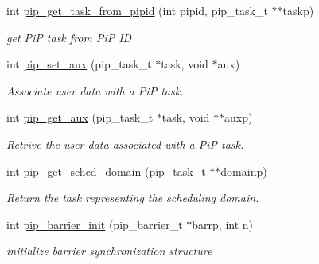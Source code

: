 \begin{DoxyCompactItemize}
\item 
int \hyperlink{group__libpip_ga6772c4ea654ccd1e0ca637f729cf3e88}{pip\-\_\-get\-\_\-task\-\_\-from\-\_\-pipid} (int pipid, pip\-\_\-task\-\_\-t $\ast$$\ast$taskp)
\begin{DoxyCompactList}\small\item\em get Pi\-P task from Pi\-P I\-D \end{DoxyCompactList}\end{DoxyCompactItemize}
\begin{DoxyCompactItemize}
\item 
int \hyperlink{group__libpip_gacfd984207deedf86edddbb72c5d4e883}{pip\-\_\-set\-\_\-aux} (pip\-\_\-task\-\_\-t $\ast$task, void $\ast$aux)
\begin{DoxyCompactList}\small\item\em Associate user data with a Pi\-P task. \end{DoxyCompactList}\end{DoxyCompactItemize}
\begin{DoxyCompactItemize}
\item 
int \hyperlink{group__libpip_ga8bf51911ca0b18340b29fae90ab59b03}{pip\-\_\-get\-\_\-aux} (pip\-\_\-task\-\_\-t $\ast$task, void $\ast$$\ast$auxp)
\begin{DoxyCompactList}\small\item\em Retrive the user data associated with a Pi\-P task. \end{DoxyCompactList}\end{DoxyCompactItemize}
\begin{DoxyCompactItemize}
\item 
int \hyperlink{group__libpip_ga32119e3a41a4073b52ade76bf87a5589}{pip\-\_\-get\-\_\-sched\-\_\-domain} (pip\-\_\-task\-\_\-t $\ast$$\ast$domainp)
\begin{DoxyCompactList}\small\item\em Return the task representing the scheduling domain. \end{DoxyCompactList}\end{DoxyCompactItemize}
\begin{DoxyCompactItemize}
\item 
int \hyperlink{group__libpip_ga84022f9c64f431e7d513342aeed0b61e}{pip\-\_\-barrier\-\_\-init} (pip\-\_\-barrier\-\_\-t $\ast$barrp, int n)
\begin{DoxyCompactList}\small\item\em initialize barrier synchronization structure \end{DoxyCompactList}\end{DoxyCompactItemize}
